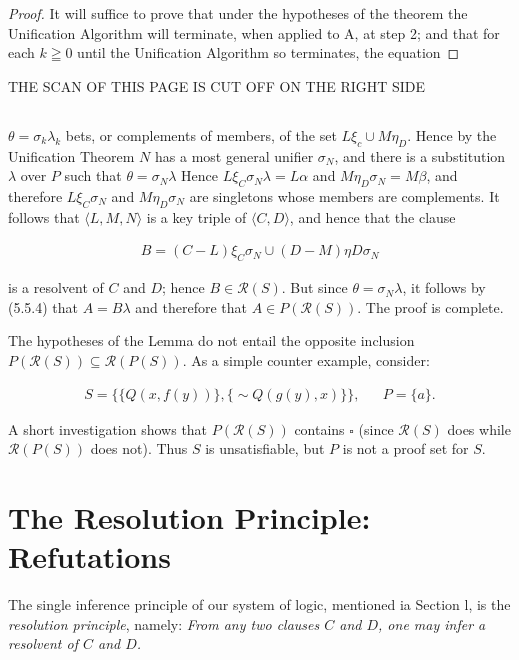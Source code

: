 \documentclass[8pt]{extarticle}
\begin{document}
\begin{proof}
It will suffice to prove that under the hypotheses of the theorem the
Unification Algorithm will terminate, when applied to A, at step 2; and that
for each $k \geqq 0$  until the Unification Algorithm so terminates, the equation
\end{proof}

THE SCAN OF THIS PAGE IS CUT OFF ON THE RIGHT SIDE

\subsection{}
$\theta = \sigma_k\lambda_k$
\noindent
bets, or complements of members, of the set $L\xi_c \cup M\eta_D$. Hence by the Unification Theorem $N$ has a most general unifier $\sigma_N$, and there is a substitution $\lambda$ over $P$ such that $\theta = \sigma_N\lambda$ Hence $L\xi_C \sigma_N\lambda = L\alpha$ and $M\eta _D\sigma_N = M\beta$, and therefore $L\xi_C\sigma_N$ and $M\eta_D\sigma_N$ are singletons whose members are complements. It follows that $\langle L, M, N\rangle$ is a key triple of $\langle C, D\rangle$, and hence that the clause

\begin{align*}
    B = (C - L)\xi_C\sigma_N \cup (D - M)\eta D\sigma_N
\end{align*}

is a resolvent of $C$ and $D$; hence $B \in \mathcal{R}(S)$. But since $\theta = \sigma_N\lambda$, it follows by (5.5.4) that $A = B\lambda$ and therefore that $A \in P(\mathcal{R}(S))$. The proof is complete.

The hypotheses of the Lemma do not entail the opposite inclusion $P(\mathcal{R}(S)) \subseteq \mathcal{R}(P(S))$. As a simple counter example, consider:

\begin{align*}
    S = \{\{Q(x,f(y))\},\{\sim Q(g(y),x)\}\}, && P = \{a\}.
\end{align*}

A short investigation shows that $P(\mathcal{R}(S))$ contains $\square$ (since $\mathcal{R}(S)$ does while $\mathcal{R}(P(S))$ does not). Thus $S$ is unsatisfiable, but $P$ is not a proof set for $S$.

\section{The Resolution Principle: Refutations}

The single inference principle of our system of logic, mentioned ia Section l,
is the \emph{resolution principle}, namely: \emph{From any two clauses $C$ and $D$, one may infer a resolvent of $C$ and $D$.}
\end{document}
